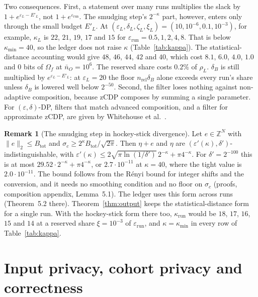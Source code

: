 \documentclass[11pt]{article}
\theoremstyle{definition}
\newtheorem{remark}{Remark}[section]
\theoremstyle{plain}
\newcommand{\Z}{\mathbb{Z}}
\begin{document}
Two consequences. First, a statement over many runs multiplies the slack by $1 + e^{\varepsilon_L - E'_L}$, not $1 + e^{\varepsilon_{\mathrm{run}}}$. The smudging step's $2^{-\kappa}$ part, however, enters only through the small budget $E'_L$. At $(\varepsilon_L, \delta_L, \zeta_L, \xi_L) = (10, 10^{-6}, 0.1, 10^{-3})$, for example, $\kappa_L$ is $22$, $21$, $19$, $17$ and $15$ for $\varepsilon_{\mathrm{run}} = 0.5, 1, 2, 4, 8$. That is below $\kappa_{\min} = 40$, so the ledger does not raise $\kappa$ (Table~\ref{tab:kappa}). The statistical-distance accounting would give $48$, $46$, $44$, $42$ and $40$, which cost $8.1$, $6.0$, $4.0$, $1.0$ and $0$ bits of $\Omega_f$ at $\bar n_O = 10^6$. The reserved share costs $0.2\%$ of $\rho_L$. $\delta_B$ is still multiplied by $e^{\varepsilon_L - E'_L}$: at $\varepsilon_L = 20$ the floor $n_{\mathrm{rel}}\delta_B$ alone exceeds every run's share unless $\delta_B$ is lowered well below $2^{-50}$. Second, the filter loses nothing against non-adaptive composition, because zCDP composes by summing a single parameter. For $(\varepsilon, \delta)$-DP, filters that match advanced composition, and a filter for approximate zCDP, are given by Whitehouse et al.~\cite{whitehouse2023fully}.

\begin{remark}[The smudging step in hockey-stick divergence]
\label{rem:sharperslack}
Let $e \in \Z^N$ with $\|e\|_2 \le B_{\mathrm{tot}}$ and $\sigma_c \ge 2^{\kappa}B_{\mathrm{tot}}/\sqrt{2\pi}$. Then $\eta + e$ and $\eta$ are $(\varepsilon'(\kappa), \delta')$-indistinguishable, with $\varepsilon'(\kappa) \le 2\sqrt{\pi\ln(1/\delta')}\,2^{-\kappa} + \pi 4^{-\kappa}$. For $\delta' = 2^{-100}$ this is at most $29.52 \cdot 2^{-\kappa} + \pi 4^{-\kappa}$, or $2.7 \cdot 10^{-11}$ at $\kappa = 40$, where the tight value is $2.0 \cdot 10^{-11}$. The bound follows from the R\'enyi bound for integer shifts and the conversion, and it needs no smoothing condition and no floor on $\sigma_c$ (proofs, composition appendix, Lemma~5.1). The ledger uses this form across runs (Theorem~5.2 there). Theorem~\ref{thm:output} keeps the statistical-distance form for a single run. With the hockey-stick form there too, $\kappa_{\mathrm{run}}$ would be $18$, $17$, $16$, $15$ and $14$ at a reserved share $\xi = 10^{-3}$ of $\varepsilon_{\mathrm{run}}$, and $\kappa = \kappa_{\min}$ in every row of Table~\ref{tab:kappa}.
\end{remark}

\section{Input privacy, cohort privacy and correctness}
\label{sec:input}
\end{document}

